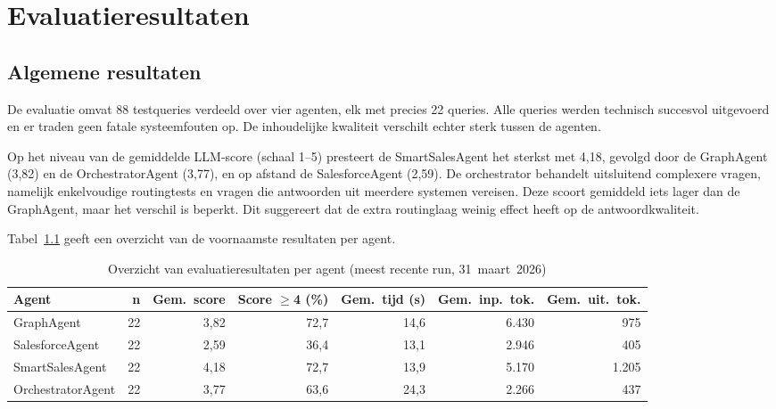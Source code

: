 
\chapter{Evaluatieresultaten}
\label{chap:resultaten}

\section{Algemene resultaten}
\label{sec:algemene-resultaten}

De evaluatie omvat 88 testqueries verdeeld over vier agenten, elk met precies 22 queries. Alle queries werden technisch succesvol uitgevoerd en er traden geen fatale systeemfouten op. De inhoudelijke kwaliteit verschilt echter sterk tussen de agenten.

Op het niveau van de gemiddelde LLM-score (schaal 1--5) presteert de SmartSalesAgent het sterkst met 4,18, gevolgd door de GraphAgent (3,82) en de OrchestratorAgent (3,77), en op afstand de SalesforceAgent (2,59). De orchestrator behandelt uitsluitend complexere vragen, namelijk enkelvoudige routingtests en vragen die antwoorden uit meerdere systemen vereisen. Deze scoort gemiddeld iets lager dan de GraphAgent, maar het verschil is beperkt. Dit suggereert dat de extra routinglaag weinig effect heeft op de antwoordkwaliteit.

Tabel~\ref{tab:algemeen-overzicht} geeft een overzicht van de voornaamste resultaten per agent.

\begin{table}[ht]
\centering
\caption{Overzicht van evaluatieresultaten per agent (meest recente run, 31~maart~2026)}
\label{tab:algemeen-overzicht}
\renewcommand{\arraystretch}{1.3}
\begin{tabular}{lrrrrrr}
\hline
\textbf{Agent} & \textbf{n} & \textbf{Gem.\ score} & \textbf{Score $\geq$4 (\%)} & \textbf{Gem.\ tijd (s)} & \textbf{Gem.\ inp.\ tok.} & \textbf{Gem.\ uit.\ tok.} \\
\hline
GraphAgent        & 22 & 3,82 & 72,7 & 14,6 & 6.430 &   975 \\
SalesforceAgent   & 22 & 2,59 & 36,4 & 13,1 & 2.946 &   405 \\
SmartSalesAgent   & 22 & 4,18 & 72,7 & 13,9 & 5.170 & 1.205 \\
OrchestratorAgent & 22 & 3,77 & 63,6 & 24,3 & 2.266 &   437 \\
\hline
\end{tabular}
\end{table}

